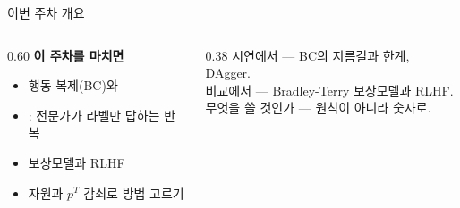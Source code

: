 \begin{frame}{이번 주차 개요}
  \small
  \begin{columns}[T]
    \begin{column}{0.60\textwidth}
      \textbf{이 주차를 마치면}
      \begin{itemize}
        \item 행동 복제(BC)와 
        \item {}: 전문가가 라벨만 답하는 반복
        \item {} 보상모델과 RLHF
        \item 자원과 $p^T$ 감쇠로 방법 고르기
      \end{itemize}
    \end{column}
    \begin{column}{0.38\textwidth}
       시연에서 — BC의 지름길과 한계, DAgger. \\[0.5em]
       비교에서 — Bradley-Terry 보상모델과 RLHF. \\[0.5em]
       무엇을 쓸 것인가 — 원칙이 아니라 숫자로.
    \end{column}
  \end{columns}
\end{frame}
